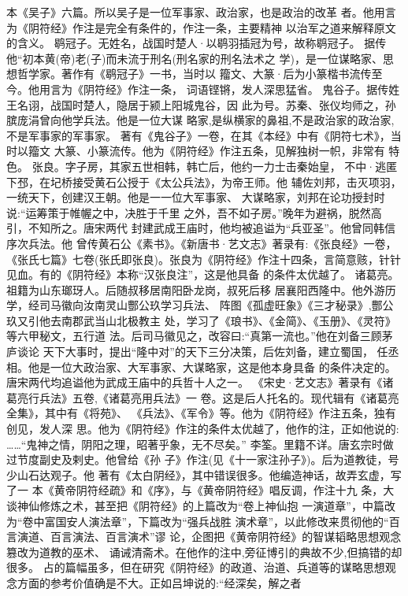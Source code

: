 \documentclass[12pt,UTF8]{ctexbook}
\begin{document}
本《吴子》六篇。所以吴子是一位军事家、政治家，也是政治的改革
者。他用言为《阴符经》作注是完全有条件的，作注一条，主要精神
以治军之道来解释原文的含义。
鹖冠子。无姓名，战国时楚人·以鹖羽插冠为号，故称鹖冠子。
据传他“初本黄(帝)老(子)而未流于刑名(刑名家的刑名法术之
学)，是一位谋略家、思想哲学家。著作有《鹖冠子》一书，当时以
籀文、大篆·后为小篆楷书流传至今。他用言为《阴符经》作注一条，
词语铿锵，发人深思猛省。
鬼谷子。据传姓王名诩，战国时楚人，隐居于颍上阳城鬼谷，因
此为号。苏秦、张仪均师之，孙膑庞涓曾向他学兵法。他是一位大谋
略家,是纵横家的鼻祖,不是政治家的政治家,不是军事家的军事家。
著有《鬼谷子》一卷，在其《本经》中有《阴符七术》，当时以籀文
大篆、小篆流传。他为《阴符经》作注五条，见解独树一帜，非常有
特色。
张良。字子房，其家五世相韩，韩亡后，他约一力士击秦始皇，
不中·逃匿下邳，在圮桥接受黄石公授于《太公兵法》，为帝王师。他
辅佐刘邦，击灭项羽，一统天下，创建汉王朝。他是一一位大军事家、
大谋略家，刘邦在论功授封时说:“运筹策于帷幄之中，决胜于千里
之外，吾不如子房。”晚年为避祸，脱然高引，不知所之。唐宋两代
封建武成王庙时，他均被追谥为“兵亚圣”。他曾同韩信序次兵法。他
曾传黄石公《素书》。《新唐书·艺文志》著录有:《张良经》一卷，
《张氏七篇》七卷(张氏即张良)。张良为《阴符经》作注十四条，言简意赅，针针见血。有的《阴符经》本称“汉张良注”，这是他具备
的条件太优越了。
诸葛亮。祖籍为山东瑯玡人。后随叔移居南阳卧龙岗，叔死后移
居襄阳西隆中。他外游历学，经司马徽向汝南灵山酆公玖学习兵法、
阵图《孤虚旺象》《三才秘录》,酆公玖又引他去南郡武当山北极教主
处，学习了《琅书》、《金简》、《玉册》、《灵符》等六甲秘文，五行道
法。后司马徽见之，改容曰:“真第一流也。”他在刘备三顾茅庐谈论
天下大事时，提出“隆中对”的天下三分决策，后佐刘备，建立蜀国，
任丞相。他是一位大政治家、大军事家、大谋略家，这是他本身具备
的条件决定的。唐宋两代均追谥他为武成王庙中的兵哲十人之一。
《宋史·艺文志》著录有《诸葛亮行兵法》五卷,《诸葛亮用兵法》一
卷。这是后人托名的。现代辑有《诸葛亮全集》，其中有《将苑》、
《兵法》、《军令》等。他为《阴符经》作注五条，独有创见，发人深
思。他为《阴符经》作注的条件太优越了，他作的注，正如他说的:
……“鬼神之情，阴阳之理，昭著乎象，无不尽矣。”
李筌。里籍不详。唐玄宗时做过节度副史及剌史。他曾给《孙
子》作注(见《十一家注孙子》)。后为道教徒，号少山石达观子。他
著有《太白阴经》，其中错误很多。他编造神话，故弄玄虚，写了一
本《黄帝阴符经疏》和《序》，与《黄帝阴符经》唱反调，作注十九
条，大谈神仙修炼之术，甚至把《阴符经》的上篇改为“卷上神仙抱
一演道章”，中篇改为“卷中富国安人演法章”，下篇改为“强兵战胜
演术章”，以此修改来贯彻他的“百言演道、百言演法、百言演术”谬
论，企图把《黄帝阴符经》的智谋韬略思想观念篡改为道教的巫术、
诵诫清斋术。在他作的注中,旁征博引的典故不少,但搞错的却很多。
占的篇幅虽多，但在研究《阴符经》的政道、治道、兵道等的谋略思想观念方面的参考价值确是不大。正如吕坤说的:“经深矣，解之者
\end{document}
